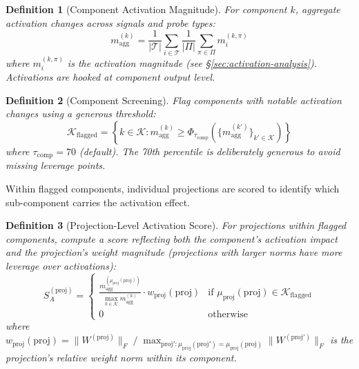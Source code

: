 \documentclass[11pt]{article}
\newtheorem{definition}{Definition}[section]
\begin{document}
\begin{definition}[Component Activation Magnitude]
\label{def:component-activation-magnitude-discovery}
For component $k$, aggregate activation changes across signals and probe types:
\begin{equation}
m^{(k)}_{\text{agg}} = \frac{1}{|\mathcal{T}|} \sum_{i \in \mathcal{T}} \frac{1}{|\Pi|} \sum_{\pi \in \Pi} m^{(k,\pi)}_i
\end{equation}
where $m^{(k,\pi)}_i$ is the activation magnitude (see \S\ref{sec:activation-analysis}). Activations are hooked at component output level.
\end{definition}

\begin{definition}[Component Screening]
\label{def:component-screening}
Flag components with notable activation changes using a generous threshold:
\begin{equation}
\mathcal{K}_{\text{flagged}} = \left\{k \in \mathcal{K} : m^{(k)}_{\text{agg}} \geq \Phi_{\tau_{\text{comp}}}\left(\{m^{(k')}_{\text{agg}}\}_{k' \in \mathcal{K}}\right)\right\}
\end{equation}
where $\tau_{\text{comp}} = 70$ (default). The 70th percentile is deliberately generous to avoid missing leverage points.
\end{definition}

Within flagged components, individual projections are scored to identify which sub-component carries the activation effect.

\begin{definition}[Projection-Level Activation Score]
\label{def:projection-level-activation-score}
For projections within flagged components, compute a score reflecting both the component's activation impact and the projection's weight magnitude (projections with larger norms have more leverage over activations):
\begin{equation}
S^{(\text{proj})}_A = \begin{cases}
\displaystyle\frac{m^{(\mu_{\text{proj}}(\text{proj}))}_{\text{agg}}}{\max_{k \in \mathcal{K}} m^{(k)}_{\text{agg}}} \cdot w_{\text{proj}}(\text{proj}) & \text{if } \mu_{\text{proj}}(\text{proj}) \in \mathcal{K}_{\text{flagged}} \\[1em]
0 & \text{otherwise}
\end{cases}
\end{equation}
where $w_{\text{proj}}(\text{proj}) = \|W^{(\text{proj})}\|_F \;/\; \max_{\text{proj}': \mu_{\text{proj}}(\text{proj}') = \mu_{\text{proj}}(\text{proj})} \|W^{(\text{proj}')}\|_F$ is the projection's relative weight norm within its component.
\end{definition}
\end{document}
